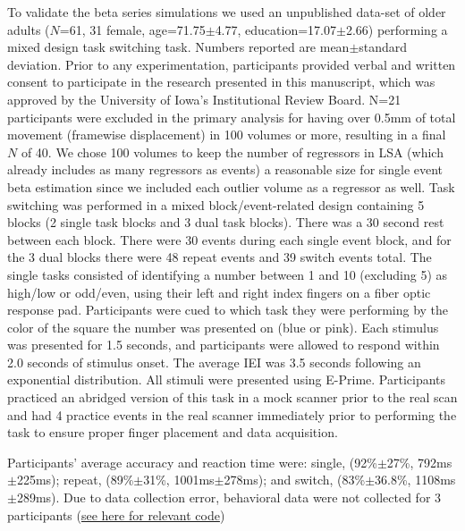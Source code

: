 \documentclass[phd,appendix,figures]{uithesis}
\begin{document}
To validate the beta series simulations we used an unpublished data-set
of older adults ($N$=61, 31 female, age=71.75$\pm$4.77, education=17.07$\pm$2.66)
performing a mixed design task switching task.
Numbers reported are mean$\pm$standard deviation.
Prior to any experimentation, participants provided verbal and written consent
to participate in the research presented in this manuscript, which was approved
by the University of Iowa's Institutional Review Board.
N=21 participants were excluded in the primary analysis for having over
0.5mm of total movement (framewise displacement) in 100 volumes or more,
resulting in a final $N$ of 40.
We chose 100 volumes to keep the number of regressors in LSA
(which already includes as many regressors as events) a reasonable size
for single event beta estimation since we included each outlier volume
as a regressor as well.
Task switching was performed in a mixed block/event-related design containing
5 blocks (2 single task blocks and 3 dual task blocks).
There was a 30 second rest between each block.
There were 30 events during each single event block,
and for the 3 dual blocks there were 48 repeat events and 39 switch events total.
The single tasks consisted of identifying a number between
1 and 10 (excluding 5) as high/low or odd/even, using their left and right index fingers
on a fiber optic response pad.
Participants were cued to which task they were performing by the color of the square
the number was presented on (blue or pink).
Each stimulus was presented for 1.5 seconds, and participants were allowed
to respond within 2.0 seconds of stimulus onset.
The average IEI was 3.5 seconds following an exponential distribution.
All stimuli were presented using E-Prime.
Participants practiced an abridged version of this task in a mock scanner
prior to the real scan and had 4 practice events in the real scanner immediately
prior to performing the task to ensure proper finger placement and data acquisition.

Participants' average accuracy and reaction time were:
single, (92\%$\pm$27\%, 792ms$\pm$225ms); repeat, (89\%$\pm$31\%, 1001ms$\pm$278ms);
and switch, (83\%$\pm$36.8\%, 1108ms$\pm$289ms).
Due to data collection error, behavioral data were not collected for 3 participants
(\href{https://github.com/jdkent/BetaSeriesRealDataAnalysis/blob/b18b44321edf7b662a1e5ea635f64452c8d3644c/summarizeBehavior/summarize_behavior.ipynb}{see here for relevant code})
\end{document}
